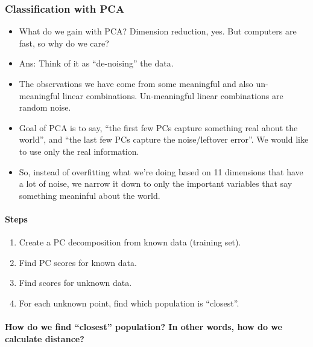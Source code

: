 \hypertarget{classification-with-pca}{%
\subsubsection{Classification with PCA}\label{classification-with-pca}}

\begin{itemize}
\tightlist
\item
  What do we gain with PCA? Dimension reduction, yes. But computers are
  fast, so why do we care?
\item
  Ans: Think of it as ``de-noising'' the data.
\item
  The observations we have come from some meaningful and also
  un-meaningful linear combinations. Un-meaningful linear combinations
  are random noise.
\item
  Goal of PCA is to say, ``the first few PCs capture something real
  about the world'', and ``the last few PCs capture the noise/leftover
  error''. We would like to use only the real information.
\item
  So, instead of overfitting what we're doing based on 11 dimensions
  that have a lot of noise, we narrow it down to only the important
  variables that say something meaninful about the world.
\end{itemize}

\hypertarget{steps}{%
\paragraph{Steps}\label{steps}}

\begin{enumerate}
\def\labelenumi{\arabic{enumi}.}
\tightlist
\item
  Create a PC decomposition from known data (training set).
\item
  Find PC scores for known data.
\item
  Find scores for unknown data.
\item
  For each unknown point, find which population is ``closest''.
\end{enumerate}

\hypertarget{how-do-we-find-closest-population-in-other-words-how-do-we-calculate-distance}{%
\paragraph{How do we find ``closest'' population? In other words, how do
we calculate
distance?}\label{how-do-we-find-closest-population-in-other-words-how-do-we-calculate-distance}}

